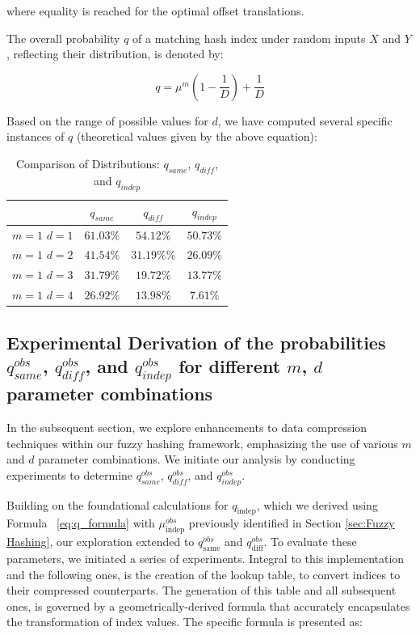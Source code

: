 where equality is reached for the optimal offset translations.

The overall probability \( q \) of a matching hash index under random inputs \( X \) and \( Y \), reflecting their distribution, is denoted by:

\begin{equation}
    q = \mu^m\left(1 - \frac{1}{D}\right) + \frac{1}{D}
    \label{eq:q_formula}
\end{equation}
    

Based on the range of possible values for \(d\), we have computed several specific instances of \(q\) (theoretical values given by the above equation):
\begin{table}[H]
    \centering
    \renewcommand{\arraystretch}{1.25}\begin{tabular}{|c|c|c|c|}
        \hline
        & $q_{same}$ & $q_{diff}$ & $q_{indep}$\\
        \hline
        \(m = 1\) \(d = 1\) & $61.03\%$ & $54.12\%$ & $50.73\%$\\
        \(m = 1\) \(d = 2\) & $41.54\%$ & $31.19\%\%$ & $26.09\%$\\
        \(m = 1\) \(d = 3\) & $31.79\%$ & $19.72\%$ & $13.77\%$\\
        \(m = 1\) \(d = 4\) & $26.92\%$ & $13.98\%$ & $7.61\%$\\
        \hline
    \end{tabular}
\caption{Comparison of Distributions: $q_{same}$, $q_{diff}$, and $q_{indep}$}
\label{tab:theoretical_q}
\end{table}

\subsection{Experimental Derivation of the probabilities $q_{same}^{obs}$, $q_{diff}^{obs}$, and $q_{indep}^{obs}$ for different \(m\), \(d\) parameter combinations} \label{sec:Experimental_derivation_q}

In the subsequent section, we explore enhancements to data compression techniques within our fuzzy hashing framework, emphasizing the use of various \(m\) and \(d\) parameter combinations. We initiate our analysis by conducting experiments to determine \(q_{same}^{obs}\), \(q_{diff}^{obs}\), and \(q_{indep}^{obs}\).

Building on the foundational calculations for \(q_{\text{indep}}\), which we derived using Formula ~\ref{eq:q_formula} with \( \mu^{obs}_{\text{indep}} \) previously identified in Section \ref{sec:Fuzzy Hashing}, our exploration extended to \(q^{obs}_{\text{same}}\) and \(q^{obs}_\text{diff}\). To evaluate these parameters, we initiated a series of experiments. Integral to this implementation and the following ones, is the creation of the lookup table, to convert indices to their compressed counterparts. The generation of this table and all subsequent ones, is governed by a geometrically-derived formula that accurately encapsulates the transformation of index values. The specific formula is presented as:

